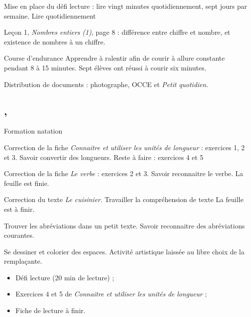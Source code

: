 \documentclass{article}
\begin{document}
\lec{} Mise en place du défi lecture : lire vingt minutes quotidiennement, sept jours par semaine.
\obj Lire quotidiennement

\gec{}

\nec{} Leçon \no{} 1, \emph{Nombres entiers (1)}, page 8 : différence entre chiffre et nombre, et existence de nombres à un chiffre.             


\eps\hpm Course d’endurance
\obj Apprendre à ralentir afin de courir à allure constante pendant 8 à 15 minutes.
\bil Sept élèves ont réussi à courir six minutes.



\adm\pmr Distribution de documents : photographe, OCCE et \emph{Petit quotidien}.

\subsection{ \sep}
\note Formation natation

\gem\ham Correction de la fiche \emph{Connaitre et utiliser les unités de longueur} : exercices 1, 2 et 3.
\obj Savoir convertir des longueurs.
\bil Reste à faire : exercices 4 et 5

\gra\han Correction de la fiche \emph{Le verbe} : exercices 2 et 3.
\obj Savoir reconnaitre le verbe.
\bil La feuille est finie.

\lec{} Correction du texte \emph{Le cuisinier}.
\obj Travailler la compréhension de texte
\bil La feuille est à finir.

\jdl{} Trouver les abréviations dans un petit texte.
\obj Savoir reconnaitre des abréviations courantes.

\art\pmr Se dessiner et colorier des espaces.
\note Activité artistique laissée au libre choix de la remplaçante.

\dev
\begin{itemize}
	\item Défi lecture (20 min de lecture) ;
	\item Exercices 4 et 5 de \emph{Connaitre et utiliser les unités de longueur} ;
	\item Fiche de lecture à finir.
\end{itemize}











\setlength{\parskip}{0ex}
\tableofcontents
\end{document}
